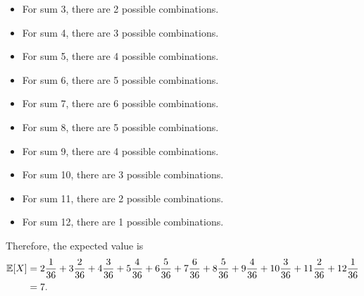 \documentclass[letterpaper]{article}
\begin{document}
\begin{mdframed}
\begin{enumerate}
\begin{mdframed}
\begin{itemize}
                \item For sum 3, there are 2 possible combinations.
                \item For sum 4, there are 3 possible combinations.  
                \item For sum 5, there are 4 possible combinations. 
                \item For sum 6, there are 5 possible combinations. 
                \item For sum 7, there are 6 possible combinations. 
                \item For sum 8, there are 5 possible combinations. 
                \item For sum 9, there are 4 possible combinations. 
                \item For sum 10, there are 3 possible combinations. 
                \item For sum 11, there are 2 possible combinations. 
                \item For sum 12, there are 1 possible combinations. 
            \end{itemize}
            Therefore, the expected value is 
            \begin{equation*}
                \begin{aligned}
                    \mathbb{E}[X] &= 2 \frac{1}{36} + 3 \frac{2}{36} + 4 \frac{3}{36} + 5 \frac{4}{36} + 6 \frac{5}{36} + 7 \frac{6}{36} + 8 \frac{5}{36} + 9 \frac{4}{36} + 10 \frac{3}{36} + 11 \frac{2}{36} + 12 \frac{1}{36} \\ 
                        &= 7.
                \end{aligned}
            \end{equation*}
        \end{mdframed}
    \end{enumerate}
\end{mdframed}
\end{document}
